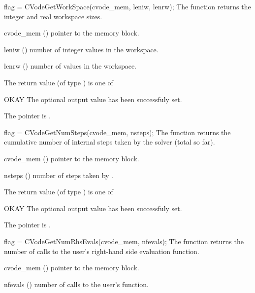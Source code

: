 {}
{
  flag = CVodeGetWorkSpace(cvode\_mem, leniw, lenrw);
}
{
  The function  returns the
  {\cvode} integer and real workspace sizes.
}
{
  \begin{args}
  \item[cvode\_mem] ()
    pointer to the {\cvode} memory block.
  \item[leniw] ()
    number of integer values in the {\cvode} workspace.
  \item[lenrw] ()
    number of  values in the {\cvode} workspace.
  \end{args}
}
{
  The return value  (of type ) is one of
  \begin{args}
  \item[OKAY] 
    The optional output value has been successfuly set.
  \item[\Id{CVG\_NO\_MEM}]
    The  pointer is .
  \end{args}
}
{}
{
  flag = CVodeGetNumSteps(cvode\_mem, nsteps);
}
{
  The function  returns the cumulative number of internal 
  steps taken by the solver (total so far).
}
{
  \begin{args}
  \item[cvode\_mem] ()
    pointer to the {\cvode} memory block.
  \item[nsteps] ()
    number of steps taken by {\cvode}.
  \end{args}
}
{
  The return value  (of type ) is one of
  \begin{args}
  \item[OKAY] 
    The optional output value has been successfuly set.
  \item[\Id{CVG\_NO\_MEM}]
    The  pointer is .
  \end{args}
}
{}
{
  flag = CVodeGetNumRhsEvals(cvode\_mem, nfevals);
}
{
  The function  returns the 
  number of calls to the user's right-hand side evaluation function.
}
{
  \begin{args}
  \item[cvode\_mem] ()
    pointer to the {\cvode} memory block.
  \item[nfevals] ()
    number of calls to the user's  function.
  \end{args}
}
